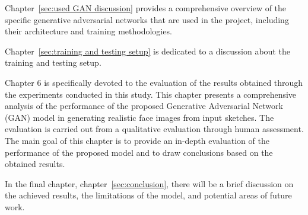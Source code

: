 \noindent Chapter~\ref{sec:used GAN discussion} provides a comprehensive overview of the specific generative adversarial networks that are used in the project, including their architecture and training methodologies. 

\noindent Chapter~\ref{sec:training and testing setup} is dedicated to a discussion about the training and testing setup.

\noindent Chapter 6 is specifically devoted to the evaluation of the results obtained through the experiments conducted in this study. This chapter presents a comprehensive analysis of the performance of the proposed Generative Adversarial Network (GAN) model in generating realistic face images from input sketches. The evaluation is carried out from a qualitative evaluation through human assessment. The main goal of this chapter is to provide an in-depth evaluation of the performance of the proposed model and to draw conclusions based on the obtained results.

\noindent In the final chapter, chapter~\ref{sec:conclusion}, there will be a brief discussion on the achieved results, the limitations of the model, and potential areas of future work.